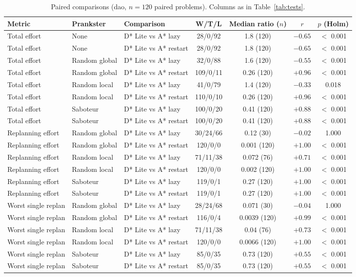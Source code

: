 \begin{table}[!t]
\centering
\footnotesize
\caption{Paired comparisons (dao, $n=120$ paired problems). Columns as in Table~\ref{tab:tests}.}
\label{tab:tests-dao}
\begin{tabular}{lllcccc}
\toprule
Metric & Prankster & Comparison & W/T/L & Median ratio ($n$) & $r$ & $p$ (Holm) \\
\midrule
Total effort & None & D* Lite vs A* lazy & 28/0/92 & 1.8 (120) & $-0.65$ & $<$ 0.001 \\
Total effort & None & D* Lite vs A* restart & 28/0/92 & 1.8 (120) & $-0.65$ & $<$ 0.001 \\
Total effort & Random global & D* Lite vs A* lazy & 32/0/88 & 1.6 (120) & $-0.55$ & $<$ 0.001 \\
Total effort & Random global & D* Lite vs A* restart & 109/0/11 & 0.26 (120) & $+0.96$ & $<$ 0.001 \\
Total effort & Random local & D* Lite vs A* lazy & 41/0/79 & 1.4 (120) & $-0.33$ & 0.018 \\
Total effort & Random local & D* Lite vs A* restart & 110/0/10 & 0.26 (120) & $+0.96$ & $<$ 0.001 \\
Total effort & Saboteur & D* Lite vs A* lazy & 100/0/20 & 0.41 (120) & $+0.88$ & $<$ 0.001 \\
Total effort & Saboteur & D* Lite vs A* restart & 100/0/20 & 0.41 (120) & $+0.88$ & $<$ 0.001 \\
\midrule
Replanning effort & Random global & D* Lite vs A* lazy & 30/24/66 & 0.12 (30) & $-0.02$ & 1.000 \\
Replanning effort & Random global & D* Lite vs A* restart & 120/0/0 & 0.001 (120) & $+1.00$ & $<$ 0.001 \\
Replanning effort & Random local & D* Lite vs A* lazy & 71/11/38 & 0.072 (76) & $+0.71$ & $<$ 0.001 \\
Replanning effort & Random local & D* Lite vs A* restart & 120/0/0 & 0.002 (120) & $+1.00$ & $<$ 0.001 \\
Replanning effort & Saboteur & D* Lite vs A* lazy & 119/0/1 & 0.27 (120) & $+1.00$ & $<$ 0.001 \\
Replanning effort & Saboteur & D* Lite vs A* restart & 119/0/1 & 0.27 (120) & $+1.00$ & $<$ 0.001 \\
\midrule
Worst single replan & Random global & D* Lite vs A* lazy & 28/24/68 & 0.071 (30) & $-0.04$ & 1.000 \\
Worst single replan & Random global & D* Lite vs A* restart & 116/0/4 & 0.0039 (120) & $+0.99$ & $<$ 0.001 \\
Worst single replan & Random local & D* Lite vs A* lazy & 71/11/38 & 0.04 (76) & $+0.73$ & $<$ 0.001 \\
Worst single replan & Random local & D* Lite vs A* restart & 120/0/0 & 0.0066 (120) & $+1.00$ & $<$ 0.001 \\
Worst single replan & Saboteur & D* Lite vs A* lazy & 85/0/35 & 0.73 (120) & $+0.55$ & $<$ 0.001 \\
Worst single replan & Saboteur & D* Lite vs A* restart & 85/0/35 & 0.73 (120) & $+0.55$ & $<$ 0.001 \\
\bottomrule
\end{tabular}
\end{table}
